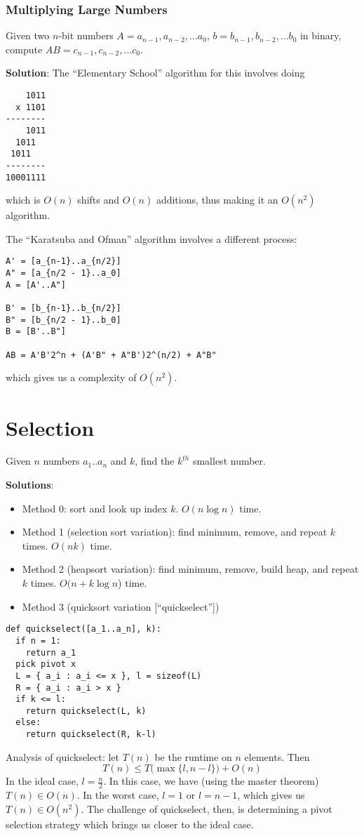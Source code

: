 \documentclass[12pt]{article}
\begin{document}
\subsubsection{Multiplying Large Numbers}
\begin{example}
Given two $n$-bit numbers $A = a_{n-1}, a_{n-2}, \dots a_0$, $b = b_{n-1}, b_{n-2}, \dots b_0$ in binary, compute $AB = c_{n-1}, c_{n-2}, \dots c_0$.

{\bf Solution}: The ``Elementary School'' algorithm for this involves doing
\begin{verbatim}
    1011
  x 1101
--------
    1011
  1011
 1011
--------
10001111
\end{verbatim}
which is $O(n)$ shifts and $O(n)$ additions, thus making it an $O(n^2)$ algorithm.

The ``Karatsuba and Ofman'' algorithm involves a different process:
\begin{verbatim}
A' = [a_{n-1}..a_{n/2}]
A" = [a_{n/2 - 1}..a_0]
A = [A'..A"]

B' = [b_{n-1}..b_{n/2}]
B" = [b_{n/2 - 1}..b_0]
B = [B'..B"]

AB = A'B'2^n + (A'B" + A"B')2^(n/2) + A"B"
\end{verbatim}
which gives us a complexity of $O(n^2)$.
\end{example}


\section{Selection}
\begin{example}
Given $n$ numbers $a_1..a_n$ and $k$, find the $k^{th}$ smallest number.

{\bf Solutions}:
\begin{itemize}
\item Method 0: sort and look up index $k$. $O(n\log n)$ time.
\item Method 1 (selection sort variation): find minimum, remove, and repeat $k$ times. $O(nk)$ time.
\item Method 2 (heapsort variation): find minimum, remove, build heap, and repeat $k$ times. $O(n + k\log n$) time.
\item Method 3 (quicksort variation [``quickselect''])
\end{itemize}

\begin{verbatim}
def quickselect([a_1..a_n], k):
  if n = 1:
    return a_1
  pick pivot x
  L = { a_i : a_i <= x }, l = sizeof(L)
  R = { a_i : a_i > x }
  if k <= l:
    return quickselect(L, k)
  else:
    return quickselect(R, k-l)
\end{verbatim}

Analysis of quickselect: let $T(n)$ be the runtime on $n$ elements. Then \[ T(n) \leq T\bigl(\max\{l, n-l\}\bigl) + O(n) \] In the ideal case, $l = \frac{n}{2}$. In this case, we have (using the master theorem) $T(n) \in O(n)$. In the worst case, $l = 1$ or $l = n - 1$, which gives us $T(n) \in O(n^2)$. The challenge of quickselect, then, is determining a pivot selection strategy which brings us closer to the ideal case.
\end{example}
\end{document}
